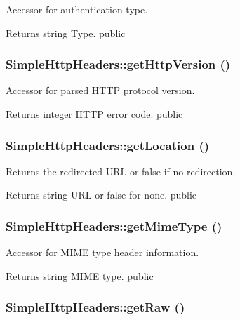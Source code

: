 \label{class_simple_http_headers_a7204275d75685916a8f4b420d3de1d79}
Accessor for authentication type. \begin{DoxyReturn}{Returns}
string Type.  public 
\end{DoxyReturn}
\hypertarget{class_simple_http_headers_af88ebe14724e4dbba3471f7cecfdc1ba}{
\subsubsection[{getHttpVersion}]{\setlength{\rightskip}{0pt plus 5cm}SimpleHttpHeaders::getHttpVersion ()}}
\label{class_simple_http_headers_af88ebe14724e4dbba3471f7cecfdc1ba}
Accessor for parsed HTTP protocol version. \begin{DoxyReturn}{Returns}
integer HTTP error code.  public 
\end{DoxyReturn}
\hypertarget{class_simple_http_headers_afb6be0a5d90e3430ce86c4ed3f174369}{
\subsubsection[{getLocation}]{\setlength{\rightskip}{0pt plus 5cm}SimpleHttpHeaders::getLocation ()}}
\label{class_simple_http_headers_afb6be0a5d90e3430ce86c4ed3f174369}
Returns the redirected URL or false if no redirection. \begin{DoxyReturn}{Returns}
string URL or false for none.  public 
\end{DoxyReturn}
\hypertarget{class_simple_http_headers_a72d3b6a11cf9e6d6e01b7dbea322052c}{
\subsubsection[{getMimeType}]{\setlength{\rightskip}{0pt plus 5cm}SimpleHttpHeaders::getMimeType ()}}
\label{class_simple_http_headers_a72d3b6a11cf9e6d6e01b7dbea322052c}
Accessor for MIME type header information. \begin{DoxyReturn}{Returns}
string MIME type.  public 
\end{DoxyReturn}
\hypertarget{class_simple_http_headers_ae0349d693484f2c97186736c2ef07476}{
\subsubsection[{getRaw}]{\setlength{\rightskip}{0pt plus 5cm}SimpleHttpHeaders::getRaw ()}}

